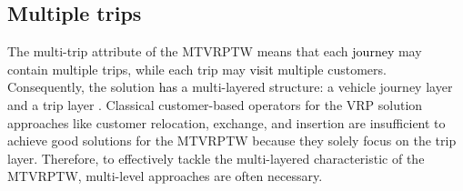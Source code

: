 \documentclass[11pt]{article}
\newcommand\add[1]{\textcolor{black}{#1}}
\begin{document}
\subsection{Multiple trips}
The multi-trip attribute of the MTVRPTW means that each \add{journey} may contain multiple trips, while each trip may \add{visit} multiple customers.  Consequently, the solution \add{has} a multi-layered structure: a vehicle journey layer and a trip layer \citep{wang2014metaheuristic}.  Classical customer-based operators for the VRP solution approaches like customer relocation, exchange, and insertion are insufficient to achieve good solutions for the MTVRPTW because they solely focus on the trip layer.  Therefore, to effectively tackle the multi-layered characteristic of the MTVRPTW, multi-level approaches are often necessary.  
\newline
\end{document}
